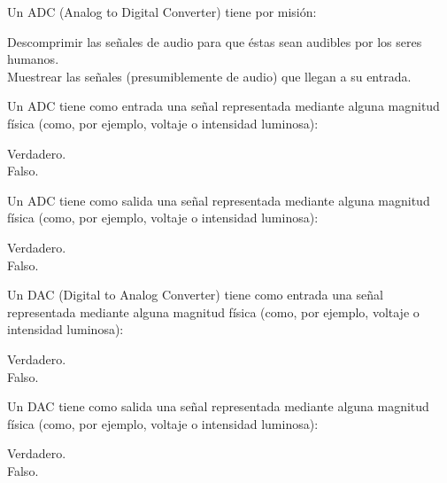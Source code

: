 \documentclass[legalpaper, 12pt, addpoints]{exam}
\begin{document}
\begin{questions}
\vspace{0.10in}

\question Un ADC (Analog to Digital Converter) tiene por misión:

\begin{oneparchoices}
  \choice Descomprimir las señales de audio para que éstas sean audibles por los seres humanos.\\
  \choice Muestrear las señales (presumiblemente de audio) que llegan a su entrada.
\end{oneparchoices}
  
\vspace{0.10in}

\question Un ADC tiene como entrada una señal representada mediante
alguna magnitud física (como, por ejemplo, voltaje o intensidad
luminosa):

\begin{oneparchoices}
  \choice Verdadero.\\
  \choice Falso.
\end{oneparchoices}
  
\vspace{0.10in}

\question Un ADC tiene como salida una señal representada mediante
alguna magnitud física (como, por ejemplo, voltaje o intensidad
luminosa):

\begin{oneparchoices}
  \choice Verdadero.\\
  \choice Falso.
\end{oneparchoices}

\question Un DAC (Digital to Analog Converter) tiene como entrada una
señal representada mediante alguna magnitud física (como, por ejemplo,
voltaje o intensidad luminosa):

\begin{oneparchoices}
  \choice Verdadero.\\
  \choice Falso.
\end{oneparchoices}
  
\vspace{0.10in}

\question Un DAC tiene como salida una señal representada mediante
alguna magnitud física (como, por ejemplo, voltaje o intensidad
luminosa):

\begin{oneparchoices}
  \choice Verdadero.\\
  \choice Falso.
\end{oneparchoices}
  

\end{questions}
\end{document}
